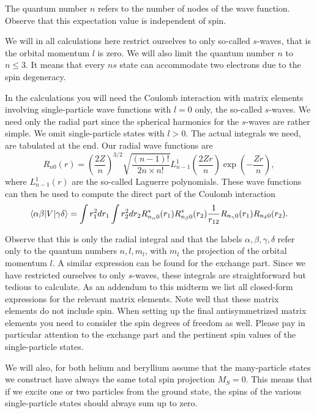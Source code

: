 \documentclass{article}
\DeclarePairedDelimiter\bra{\langle}{\rvert}
\DeclarePairedDelimiter\ket{\lvert}{\rangle}
\begin{document}
The quantum number $n$ refers to the number of nodes of the wave function.
Observe that this expectation value is independent of spin.

We will in all calculations here restrict ourselves to only so-called $s$-waves, that is the orbital momentum $l$ is zero.
We will also limit the quantum number $n$ to $n \le 3$.
It means that every $ns$ state can accommodate two electrons due to the spin degeneracy.

In the calculations you will need the Coulomb interaction with matrix elements involving single-particle wave functions with $l = 0$ only, the
so-called $s$-waves.
We need only the radial part since the spherical harmonics for the $s$-waves are rather simple.
We omit single-particle states with $l > 0$.
The actual integrals we need, are tabulated at the end.
Our radial wave functions are
\begin{equation*}
    R_{n0}(r) = \left( \frac{2Z}{n} \right)^{3/2} \sqrt{\frac{(n-1)!}{2n\times n!}} L_{n-1}^1 \left( \frac{2Zr}{n} \right) \exp{\left( -\frac{Zr}{n} \right)},
\end{equation*}
where $L_{n-1}^1(r)$ are the so-called Laguerre polynomials.
These wave functions can then be used to compute the direct part of the Coulomb interaction
\begin{equation*}
    \bra{\alpha\beta} V \ket{\gamma\delta}
    = \int r_1^2 dr_1
    \int r_2^2 dr_2 R_{n_{\alpha} 0}^*(r_1) R_{n_{\beta} 0}^*(r_2) \frac{1}{r_{12}}R_{n_{\gamma} 0}(r_1) R_{n_{\delta} 0}(r_2).
\end{equation*}

Observe that this is only the radial integral and that the labels $\alpha,\beta,\gamma,\delta$ refer only to the quantum numbers $n,l,m_l$, with $m_l$ the projection of the orbital momentum $l$.
A similar expression can be found for the exchange part.
Since we have restricted ourselves to only $s$-waves, these integrals are straightforward but tedious to calculate.
As an addendum to this midterm we list all closed-form expressions for the relevant matrix
elements.
Note well that these matrix elements do not include spin.
When setting up the final antisymmetrized matrix elements you need to consider the spin degrees of freedom as well.
Please pay in particular attention to the exchange part and the pertinent spin values of the single-particle states.

We will also, for both helium and beryllium assume that the many-particle states we construct have always the same total spin
projection $M_S = 0$.
This means that if we excite one or two particles from the ground state, the spins of the various single-particle states should always sum up to zero.
\end{document}
